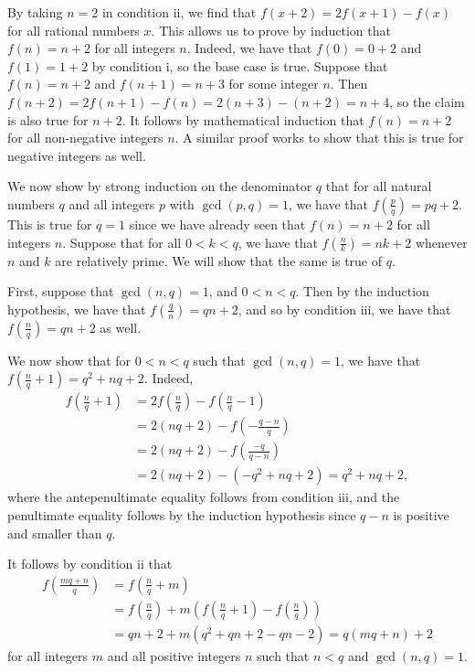 \documentclass{article}
\begin{document}
\begin{enumerate}[1.]
By taking $n = 2$ in condition ii, we find that $f(x + 2) = 2f(x + 1) - f(x)$ for all rational numbers $x$. This allows us to prove by induction that $f(n) = n + 2$ for all integers $n$. Indeed, we have that $f(0) = 0 + 2$ and $f(1) = 1 + 2$ by condition i, so the base case is true. Suppose that $f(n) = n + 2$ and $f(n + 1) = n + 3$ for some integer $n$. Then $f(n + 2) = 2f(n + 1) - f(n) = 2(n + 3) - (n + 2) = n + 4$, so the claim is also true for $n + 2$. It follows by mathematical induction that $f(n) = n + 2$ for all non-negative integers $n$. A similar proof works to show that this is true for negative integers as well.

We now show by strong induction on the denominator $q$ that for all natural numbers $q$ and all integers $p$ with $\gcd(p, q) = 1$, we have that $f\left(\frac{p}{q}\right) = pq + 2$. This is true for $q = 1$ since we have already seen that $f(n) = n + 2$ for all integers $n$. Suppose that for all $0 < k < q$, we have that $f\left(\frac{n}{k}\right) = nk + 2$ whenever $n$ and $k$ are relatively prime. We will show that the same is true of $q$.

First, suppose that $\gcd(n, q) = 1$, and $0 < n < q$. Then by the induction hypothesis, we have that $f\left(\frac{q}{n}\right) = qn + 2$, and so by condition iii, we have that $f\left(\frac{n}{q}\right) = qn + 2$ as well.

We now show that for $0 < n < q$ such that $\gcd(n, q) = 1$, we have that $f\left(\frac{n}{q} + 1\right) = q^2 + nq + 2$. Indeed,
\begin{align*}
  f\left(\frac{n}{q} + 1\right) & = 2f\left(\frac{n}{q}\right) - f\left(\frac{n}{q} - 1\right) \\
  & = 2(nq + 2) - f\left(-\frac{q - n}{q}\right) \\
  & = 2(nq + 2) - f\left(\frac{-q}{q - n}\right) \\
  & = 2(nq + 2) - (-q^2 + nq + 2) = q^2 + nq + 2,
\end{align*}
where the antepenultimate equality follows from condition iii, and the penultimate equality follows by the induction hypothesis since $q - n$ is positive and smaller than $q$.

It follows by condition ii that
\begin{align*}
  f\left(\frac{mq + n}{q}\right) & = f\left(\frac{n}{q} + m\right) \\
  & = f\left(\frac{n}{q}\right) + m\left(f\left(\frac{n}{q} + 1\right) - f\left(\frac{n}{q}\right)\right) \\
  & = qn + 2 + m(q^2 + qn + 2 - qn - 2) = q(mq + n) + 2
\end{align*}
for all integers $m$ and all positive integers $n$ such that $n < q$ and $\gcd(n, q) = 1$.


\end{enumerate}
\end{document}
